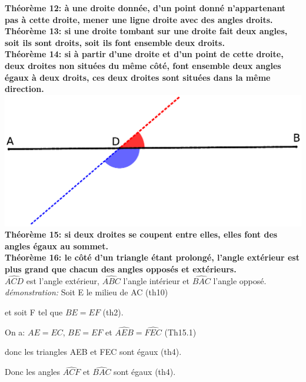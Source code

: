 \documentclass[a4paper, 12pt, twoside]{book}
\begin{document}
 \textbf{Théorème 12:  à une droite donnée, d'un point donné n'appartenant pas à cette droite, mener une ligne droite avec des angles droits.}\\
 
 \textbf{Théorème 13: si une droite tombant sur une droite fait deux angles, soit ils sont droits, soit ils font ensemble deux droits.}\\
 
 \textbf{Théorème 14: si à partir d'une droite et d'un point de cette droite, deux droites non situées du même côté, font ensemble deux angles égaux à deux droits, ces deux droites sont situées dans la même direction.}\\
 
      
 \includegraphics[scale=0.2]{figures/th14.eps} \\
 
 
 \textbf{Théorème 15: si deux droites se coupent entre elles, elles font des angles égaux au sommet.}\\
 
 \textbf{Théorème 16: le côté d'un triangle étant prolongé, l'angle extérieur est plus grand que chacun des angles opposés et extérieurs.}\\
  
  $\hat{ACD}$ est l'angle extérieur, $\hat{ABC}$ l'angle intérieur et $\hat{BAC}$ l'angle opposé.\\
  
   
   
   \textit{démonstration:} Soit E le milieu de AC (th10)\
   
    et soit F tel que $BE=EF$ (th2).\
   
   On a: $AE=EC$, $BE=EF$ et $\hat{AEB}=\hat{FEC}$ (Th15.1)\
   
   donc les triangles AEB et FEC sont égaux (th4).\
   
    Donc les angles $\hat{ACF}$ et $\hat{BAC}$ sont égaux (th4).\
   
\end{document}
